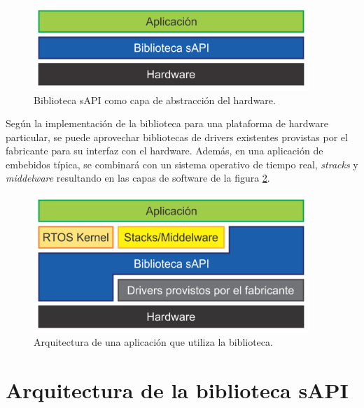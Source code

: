 \begin{figure}[!htbp]
\begin{center}  %
\includegraphics*[width=10.4cm]{Figures/sapiCapas1.png}
\par\caption{Biblioteca sAPI como capa de abstracción del hardware.}\label{fig:sapiCapas1}
\end{center}
\end{figure}

Según la implementación de la biblioteca para una plataforma de hardware particular, se puede aprovechar bibliotecas de drivers existentes provistas por el fabricante para su interfaz con el hardware. Además, en una aplicación de embebidos típica, se combinará con un sistema operativo de tiempo real, \emph{stracks} y \emph{middelware} resultando en las capas de software de la figura \ref{fig:sapiCapas2}.

\begin{figure}[!htbp]
\begin{center}  %
\includegraphics*[width=10.4cm]{Figures/sapiCapas2.png}
\par\caption{Arquitectura de una aplicación que utiliza la biblioteca.}\label{fig:sapiCapas2}
\end{center}
\end{figure}

\section{Arquitectura de la biblioteca sAPI}
\label{sec:arqSapi}

